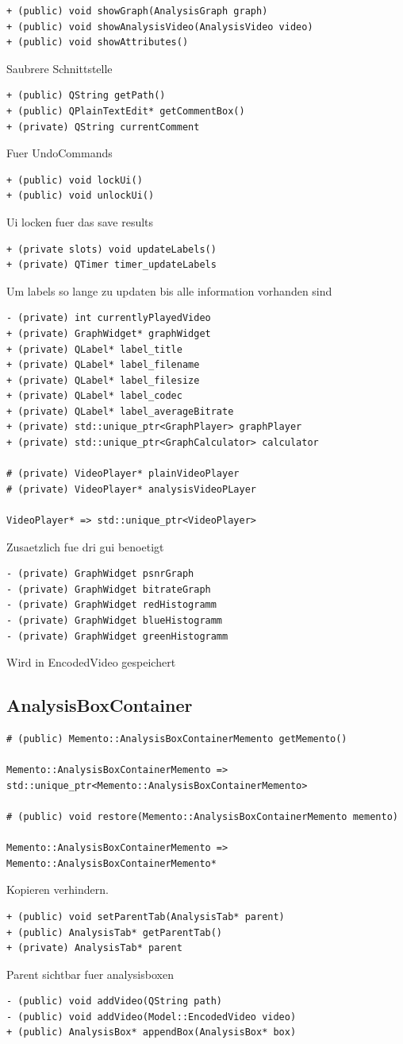 \documentclass{scrartcl}
\begin{document}
{\begin{verbatim}
+ (public) void showGraph(AnalysisGraph graph)
+ (public) void showAnalysisVideo(AnalysisVideo video)
+ (public) void showAttributes()
\end{verbatim}
Saubrere Schnittstelle
\begin{verbatim}
+ (public) QString getPath()
+ (public) QPlainTextEdit* getCommentBox()
+ (private) QString currentComment
\end{verbatim}
Fuer UndoCommands
\begin{verbatim}
+ (public) void lockUi()
+ (public) void unlockUi()
\end{verbatim}
Ui locken fuer das save results
\begin{verbatim}
+ (private slots) void updateLabels()
+ (private) QTimer timer_updateLabels
\end{verbatim}
Um labels so lange zu updaten bis alle information vorhanden sind
\begin{verbatim}
- (private) int currentlyPlayedVideo
+ (private) GraphWidget* graphWidget
+ (private) QLabel* label_title
+ (private) QLabel* label_filename
+ (private) QLabel* label_filesize
+ (private) QLabel* label_codec
+ (private) QLabel* label_averageBitrate
+ (private) std::unique_ptr<GraphPlayer> graphPlayer
+ (private) std::unique_ptr<GraphCalculator> calculator

# (private) VideoPlayer* plainVideoPlayer
# (private) VideoPlayer* analysisVideoPLayer

VideoPlayer* => std::unique_ptr<VideoPlayer>
\end{verbatim}
Zusaetzlich fue dri gui benoetigt
\begin{verbatim}
- (private) GraphWidget psnrGraph
- (private) GraphWidget bitrateGraph
- (private) GraphWidget redHistogramm
- (private) GraphWidget blueHistogramm
- (private) GraphWidget greenHistogramm
\end{verbatim}
Wird in EncodedVideo gespeichert
\subsection{AnalysisBoxContainer}
\begin{verbatim}
# (public) Memento::AnalysisBoxContainerMemento getMemento()

Memento::AnalysisBoxContainerMemento => std::unique_ptr<Memento::AnalysisBoxContainerMemento>

# (public) void restore(Memento::AnalysisBoxContainerMemento memento)

Memento::AnalysisBoxContainerMemento => Memento::AnalysisBoxContainerMemento*
\end{verbatim}
Kopieren verhindern.
\begin{verbatim}
+ (public) void setParentTab(AnalysisTab* parent)
+ (public) AnalysisTab* getParentTab()
+ (private) AnalysisTab* parent
\end{verbatim}
Parent sichtbar fuer analysisboxen
\begin{verbatim}
- (public) void addVideo(QString path)
- (public) void addVideo(Model::EncodedVideo video)
+ (public) AnalysisBox* appendBox(AnalysisBox* box)


\end{verbatim}}
\end{document}

